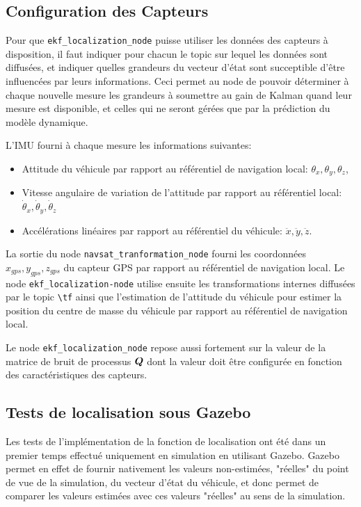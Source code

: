\documentclass[12pt,a4paper]{report}
\begin{document}
	\subsection{Configuration des Capteurs}
	Pour que \verb|ekf_localization_node| puisse utiliser les données des capteurs à disposition, il faut indiquer pour chacun le topic sur lequel les données sont diffusées, et indiquer quelles grandeurs du vecteur d'état sont succeptible d'être influencées par leurs informations. Ceci permet au node de pouvoir déterminer à chaque nouvelle mesure les grandeurs à soumettre au gain de Kalman quand leur mesure est disponible, et celles qui ne seront gérées que par la prédiction du modèle dynamique.
	
	\para L'IMU fourni à chaque mesure les informations suivantes:
	\begin{itemize}
		\item Attitude du véhicule par rapport au référentiel de navigation local: $\theta_x, \theta_y, \theta_z$,
		\item Vitesse angulaire de variation de l'attitude par rapport au référentiel local:
		$\dot{\theta}_x, \dot{\theta}_y, \dot{\theta}_z$ 
		\item Accélérations linéaires par rapport au référentiel du véhicule: $\ddot{x}, \ddot{y},\ddot{z}$.
	\end{itemize}

	\para La sortie du node \verb|navsat_tranformation_node| fourni les coordonnées $x_{gps},y_{gps},z_{gps}$ du capteur GPS par rapport au référentiel de navigation local. Le node \verb|ekf_localization-node| utilise ensuite les transformations internes diffusées par le topic \verb|\tf| ainsi que l'estimation de l'attitude du véhicule pour estimer la position du centre de masse du véhicule par rapport au référentiel de navigation local.
	
	\para Le node \verb|ekf_localization_node| repose aussi fortement sur la valeur de la matrice de bruit de processus $\boldsymbol{Q}$ dont la valeur doit être configurée en fonction des caractéristiques des capteurs.
	
	\subsection{Tests de localisation sous Gazebo}
	
	Les tests de l'implémentation de la fonction de localisation ont été dans un premier temps effectué uniquement en simulation en utilisant Gazebo. Gazebo permet en effet de fournir nativement les valeurs non-estimées, "réelles" du point de vue de la simulation, du vecteur d'état du véhicule, et donc permet de comparer les valeurs estimées avec ces valeurs "réelles" au sens de la simulation.
	
\end{document}
